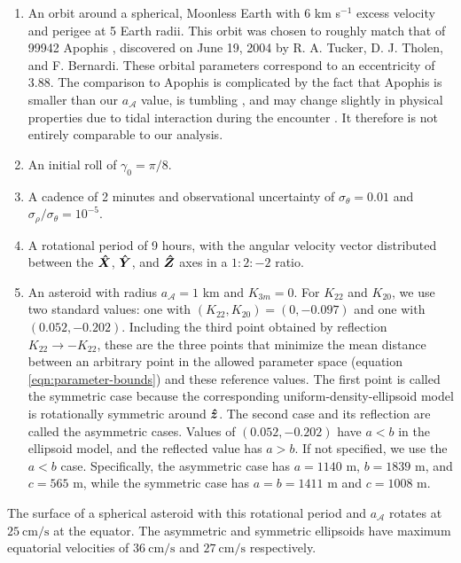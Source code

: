 \begin{enumerate}
  \item An orbit around a spherical, Moonless Earth with $6$ km s$^{-1}$ excess velocity and perigee at 5 Earth radii. This orbit was chosen to roughly match that of 99942 Apophis \cite{giorgini2005recent, giorgini2008predicting, smalley20052004}, discovered on June 19, 2004 by R. A. Tucker, D. J. Tholen, and F. Bernardi. These orbital parameters correspond to an eccentricity of 3.88. The comparison to Apophis is complicated by the fact that Apophis is smaller than our $a_\mathcal{A}$ value, is tumbling \cite{PRAVEC201448}, and may change slightly in physical properties due to tidal interaction during the encounter \cite{yu2014numerical,hirabayashi2021finite}. It therefore is not entirely comparable to our analysis. 
  \item An initial roll of $\gamma_0=\pi/8$.
  \item A cadence of 2 minutes and observational uncertainty of $\sigma_\theta = 0.01$ and $\sigma_\rho / \sigma_\theta = 10^{-5}$.
  \item A rotational period of 9 hours, with the angular velocity vector distributed between the $\bm{\hat{X}}$, $\bm{\hat{Y}}$, and $\bm{\hat{Z}}$ axes in a $1:2:-2$ ratio.
  \item An asteroid with radius $a_\mathcal{A} = 1$ km and $K_{3m}=0$. For $K_{22}$ and $K_{20}$, we use two standard values: one with $(K_{22}, K_{20}) = (0, -0.097)$ and one with $(0.052, -0.202)$. Including the third point obtained by reflection $K_{22}\rightarrow -K_{22}$, these are the three points that minimize the mean distance between an arbitrary point in the allowed parameter space (equation \ref{eqn:parameter-bounds}) and these reference values. The first point is called the symmetric case because the corresponding uniform-density-ellipsoid model is rotationally symmetric around $\bm{\hat{z}}$. The second case and its reflection are called the asymmetric cases. Values of $(0.052, -0.202)$ have $a < b$ in the ellipsoid model, and the reflected value has $a > b$. If not specified, we use the $a < b$ case. Specifically, the asymmetric case has $a=1140$ m, $b=1839$ m, and $c=565$ m, while the symmetric case has $a=b=1411$ m and $c=1008$ m.
\end{enumerate}

The surface of a spherical asteroid with this rotational period and $a_\mathcal{A}$ rotates at $\SI{25}{\centi\meter\per\second}$ at the equator. The asymmetric and symmetric ellipsoids have maximum equatorial velocities of $\SI{36}{\centi\meter\per\second}$ and $\SI{27}{\centi\meter\per\second}$ respectively.

